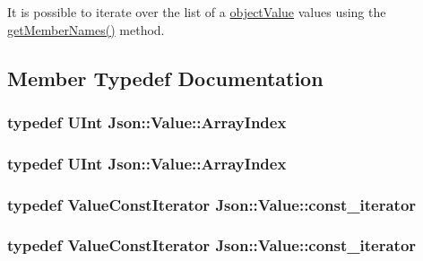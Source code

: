 It is possible to iterate over the list of a \hyperlink{namespaceJson_a7d654b75c16a57007925868e38212b4ea6ca35c0a30ea3d1b8ec95c2d1e41a1a8}{object\-Value} values using the \hyperlink{classJson_1_1Value_a179f6d002c2bb916ce0d0b9db9b87ebe}{get\-Member\-Names()} method. 

\subsection{Member Typedef Documentation}
\hypertarget{classJson_1_1Value_a5b1b5f0fbe81bec133b054419a6273cd}{
\subsubsection[{Array\-Index}]{\setlength{\rightskip}{0pt plus 5cm}typedef {\bf U\-Int} {\bf Json\-::\-Value\-::\-Array\-Index}}}\label{d1/db8/classJson_1_1Value_a5b1b5f0fbe81bec133b054419a6273cd}
\hypertarget{classJson_1_1Value_a5b1b5f0fbe81bec133b054419a6273cd}{
\subsubsection[{Array\-Index}]{\setlength{\rightskip}{0pt plus 5cm}typedef {\bf U\-Int} {\bf Json\-::\-Value\-::\-Array\-Index}}}\label{d1/db8/classJson_1_1Value_a5b1b5f0fbe81bec133b054419a6273cd}
\hypertarget{classJson_1_1Value_af92282ca92b58b320debd486afb7696a}{
\subsubsection[{const\-\_\-iterator}]{\setlength{\rightskip}{0pt plus 5cm}typedef {\bf Value\-Const\-Iterator} {\bf Json\-::\-Value\-::const\-\_\-iterator}}}\label{d1/db8/classJson_1_1Value_af92282ca92b58b320debd486afb7696a}
\hypertarget{classJson_1_1Value_af92282ca92b58b320debd486afb7696a}{
\subsubsection[{const\-\_\-iterator}]{\setlength{\rightskip}{0pt plus 5cm}typedef {\bf Value\-Const\-Iterator} {\bf Json\-::\-Value\-::const\-\_\-iterator}}}\label{d1/db8/classJson_1_1Value_af92282ca92b58b320debd486afb7696a}
